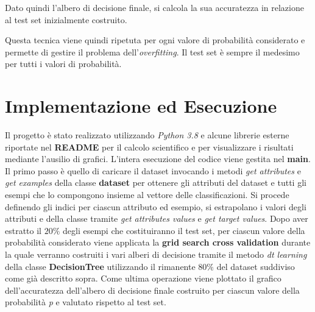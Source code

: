 \documentclass[a4paper, 10pt]{article}
\begin{document}
Dato quindi l'albero di decisione finale, si calcola la sua accuratezza in relazione al test set inizialmente costruito.

Questa tecnica viene quindi ripetuta per ogni valore di probabilità considerato e permette di gestire il problema dell'\textit{overfitting}. Il test set è sempre il medesimo per tutti i valori di probabilità.
\section{Implementazione ed Esecuzione}
Il progetto è stato realizzato utilizzando \textit{Python 3.8} e alcune librerie esterne riportate nel \textbf{README} per il calcolo scientifico e per visualizzare i risultati mediante l'ausilio di grafici. L'intera esecuzione del codice viene gestita nel \textbf{main}. Il primo passo è quello di caricare il dataset invocando i metodi \textit{get attributes} e \textit{get examples} della classe \textbf{dataset} per ottenere gli attributi del dataset e tutti gli esempi che lo compongono insieme al vettore delle classificazioni. Si procede definendo gli indici per ciascun attributo ed esempio, si estrapolano i valori degli attributi e della classe tramite \textit{get attributes values} e \textit{get target values}. Dopo aver estratto il $20\%$ degli esempi che costituiranno il test set, per ciascun valore della probabilità considerato viene applicata la \textbf{grid search cross validation} durante la quale verranno costruiti i vari alberi di decisione tramite il metodo \textit{dt learning} della classe \textbf{DecisionTree} utilizzando il rimanente $80\%$ del dataset suddiviso come già descritto sopra. Come ultima operazione viene plottato il grafico dell'accuratezza dell'albero di decisione finale costruito per ciascun valore della probabilità \textit{p} e valutato rispetto al test set.
\end{document}
